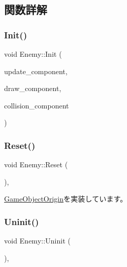 \subsection{関数詳解}
\mbox{\label{class_enemy_abd6d8dea6f50de0809ef2bd639ec97fe}} 
\subsubsection{\texorpdfstring{Init()}{Init()}}
{\footnotesize\ttfamily void Enemy\+::\+Init (\begin{DoxyParamCaption}\item[{\mbox{\hyperlink{class_update_component}{Update\+Component}} $\ast$}]{update\+\_\+component,  }\item[{\mbox{\hyperlink{class_draw_component}{Draw\+Component}} $\ast$}]{draw\+\_\+component,  }\item[{\mbox{\hyperlink{class_collision_component}{Collision\+Component}} $\ast$}]{collision\+\_\+component }\end{DoxyParamCaption})}

\mbox{\label{class_enemy_ab86571061e7fcabcf8c646b1abad5581}} 
\subsubsection{\texorpdfstring{Reset()}{Reset()}}
{\footnotesize\ttfamily void Enemy\+::\+Reset (\begin{DoxyParamCaption}{ }\end{DoxyParamCaption})\hspace{0.3cm}{\ttfamily [override]}, {\ttfamily [virtual]}}



\mbox{\hyperlink{class_game_object_origin_af9af378a4fd9028316a6fdb461ed6a10}{Game\+Object\+Origin}}を実装しています。

\mbox{\label{class_enemy_a9aeaa757abdf0c37fd67c4ce5aed6962}} 
\subsubsection{\texorpdfstring{Uninit()}{Uninit()}}
{\footnotesize\ttfamily void Enemy\+::\+Uninit (\begin{DoxyParamCaption}{ }\end{DoxyParamCaption})\hspace{0.3cm}{\ttfamily [override]}, {\ttfamily [virtual]}}




